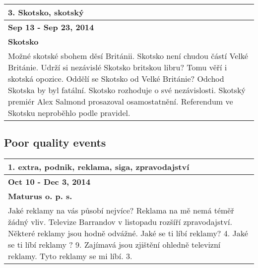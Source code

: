\begin{tabularx}{\linewidth}{p{\linewidth}} \toprule[1.5pt]
\bf 3. Skotsko, skotský \\ \midrule
\bf Sep 13 - Sep 23, 2014 \\ \midrule
\bf Skotsko \\
Možné skotské sbohem děsí Británii. Skotsko není chudou částí Velké Británie. Udrží si nezávislé Skotsko britskou libru? Tomu věří i skotská opozice. Oddělí se Skotsko od Velké Británie? Odchod Skotska by byl fatální. Skotsko rozhoduje o své nezávislosti. Skotský premiér Alex Salmond prosazoval osamostatnění. Referendum ve Skotsku neproběhlo podle pravidel. \\ \bottomrule[1.25pt]
\end{tabularx}
\hspace{\fill}

\subsection*{Poor quality events}

\begin{tabularx}{\linewidth}{p{\linewidth}} \toprule[1.5pt]
\bf 1. extra, podnik, reklama, siga, zpravodajství \\ \midrule
\bf Oct 10 - Dec 3, 2014 \\ \midrule
\bf Maturus o. p. s. \\
Jaké reklamy na vás působí nejvíce? Reklama na mě nemá téměř žádný vliv. Televize Barrandov v listopadu rozšíří zpravodajství. Některé reklamy jsou hodně odvážné. Jaké se ti líbí reklamy? 4. Jaké se ti líbí reklamy ? 9. Zajímavá jsou zjištění ohledně televizní reklamy. Tyto reklamy se mi líbí. 3. \\ \bottomrule[1.25pt]
\end{tabularx}

\hspace{\fill}

\newpage

